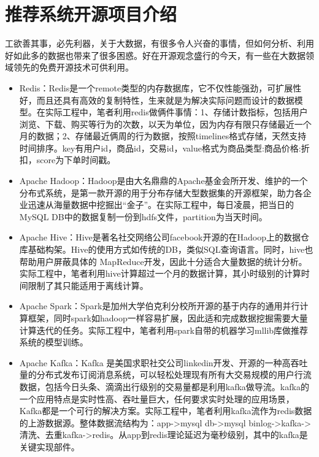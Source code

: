 \section{推荐系统开源项目介绍}
工欲善其事，必先利器，关于大数据，有很多令人兴奋的事情，但如何分析、利用好如此多的数据也带来了很多困惑。好在开源观念盛行的今天，有一些在大数据领域领先的免费开源技术可供利用。
\begin{itemize}
	\item Redis：Redis是一个remote类型的内存数据库，它不仅性能强劲，可扩展性好，而且还具有高效的复制特性，生来就是为解决实际问题而设计的数据模型。在实际工程中，笔者利用redis做俩件事情：1、存储计数指标，包括用户浏览、下载、购买等行为的次数，以天为单位，因为内存有限只存储最近一个月的数据；2、存储最近俩周的行为数据，按照timelines格式存储，天然支持时间排序。key有用户id，商品id，交易id，value格式为商品类型:商品价格:折扣，score为下单时间戳。
	\item Apache Hadoop：Hadoop是由大名鼎鼎的Apache基金会所开发、维护的一个分布式系统，是第一款开源的用于分布存储大型数据集的开源框架，助力各企业迅速从海量数据中挖掘出“金子”。在实际工程中，每日凌晨，把当日的MySQL DB中的数据复制一份到hdfs文件，partition为当天时间。
	\item Apache Hive：Hive是著名社交网络公司facebook开源的在Hadoop上的数据仓库基础构架。Hive的使用方式如传统的DB，类似SQL查询语言。同时，hive也帮助用户屏蔽具体的 MapReduce开发，因此十分适合大量数据的统计分析。实际工程中，笔者利用hive计算超过一个月的数据计算，其小时级别的计算时间限制了其只能适用于离线计算。
	\item Apache Spark：Spark是加州大学伯克利分校所开源的基于内存的通用并行计算框架，同时spark如hadoop一样容易扩展，因此适和完成数据挖掘需要大量计算迭代的任务。实际工程中，笔者利用spark自带的机器学习mllib库做推荐系统的模型训练。
	\item Apache Kafka：Kafka 是美国求职社交公司linkedin开发、开源的一种高吞吐量的分布式发布订阅消息系统，可以轻松处理现有所有大交易规模的用户行流数据，包括今日头条、滴滴出行级别的交易量都是利用kafka做导流。kafka的一个应用特点是实时性高、吞吐量巨大，任何要求实时处理的应用场景，Kafka都是一个可行的解决方案。实际工程中，笔者利用kafka流作为redis数据的上游数据源。整体数据流结构为：app->mysql db->mysql binlog->kafka->清洗、去重kafka->redis。从app到redis理论延迟为毫秒级别，其中的kafka是关键实现部件。
\end{itemize}

